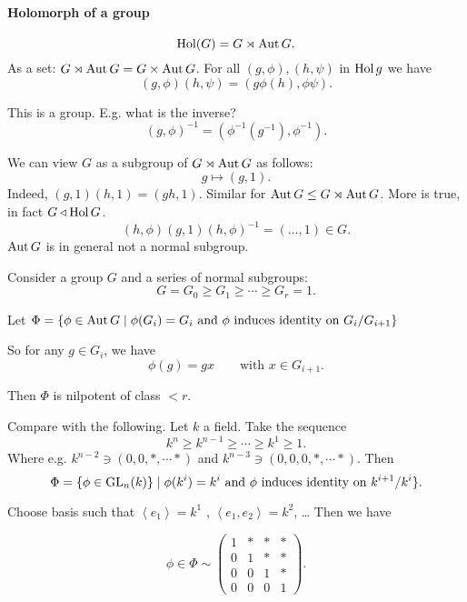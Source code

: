 

\paragraph{Holomorph of a group}

\[
    \operatorname{Hol}(G) = G \rtimes \operatorname{Aut} G
.\] 
As a set: $G \rtimes \operatorname{Aut} G = G \times  \operatorname{Aut} G$.
For all $(g, \phi), (h, \psi)$ in  $\operatorname{Hol} g$ we have
 \[
     (g, \phi)(h, \psi) = (g \phi(h), \phi \psi)
.\] 

This is a group.
E.g. what is the inverse?
\[
    (g, \phi)^{-1} = (\phi^{-1}(g^{-1}), \phi^{-1})
.\] 

We can view $G$ as a subgroup of $G \rtimes \operatorname{Aut} G$ as follows:
\[
    g \mapsto (g, 1)
.\] 
Indeed, $(g, 1)(h, 1) = (gh, 1)$.
Similar for  $\operatorname{Aut} G \le G \rtimes \operatorname{Aut} G$.
More is true, in fact $G \triangleleft \operatorname{Hol} G$.
\[
    (h, \phi)(g, 1)(h, \phi)^{-1} = (\ldots, 1) \in G
.\] 
$\operatorname{Aut} G$ is in general not a normal subgroup.

\begin{theorem}[16.3.1]
Consider a group  $G$ and a series of normal subgroups:
\[
G = G_0 \ge  G_1 \ge  \cdots \ge  G_r = 1
.\]

Let $\Phi = \{\phi \in  \operatorname{Aut} G  \mid  \phi(G_i) = G_i \text{ and } \phi \text{ induces identity on }G_i / G_{i+1} \} $

So for any $g \in G_i$, we have
\[
\phi(g) = gx \qquad \text{with } x \in G_{i+1}
.\] 

Then $\Phi$ is nilpotent of class $<r$.
\end{theorem}

\begin{remark}
    
Compare with the following. Let $k$ a field.
Take the sequence
 \[
k^{n} \ge  k^{n-1} \ge  \cdots \ge  k^{1} \ge  1
.\] 
Where e.g. $k^{n-2} \ni (0, 0, *, \cdots *)$
and $k^{n-3} \ni (0, 0, 0, *, \cdots *)$.
Then
\[
\Phi = \{\phi \in \operatorname{GL}_n(k)\}   \mid  \phi(k^{i}) = k^{i} \text{ and $\phi$ induces identity on } k^{i+1} / k^{i}\}
.\] 

Choose basis such that $\left<e_1\right> = k^{1}$ , $ \left<e_1, e_2 \right> = k^{2}$, \ldots
Then we have 

\[
\phi \in \Phi \sim \begin{pmatrix}
    1 & * & * & *\\
    0 & 1 & * & *\\
    0 & 0 & 1 & * \\
    0 & 0 & 0 & 1
\end{pmatrix}
.\] 
\end{remark}

